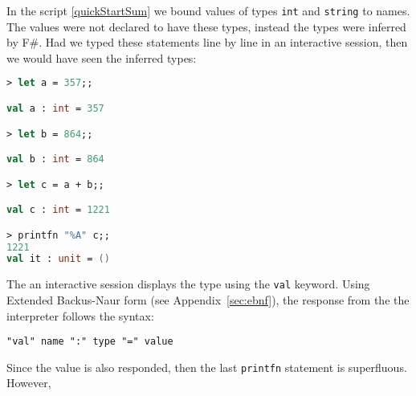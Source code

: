 In the script \ref{quickStartSum} we bound values of types \lstinline|int| and \lstinline|string| to names. The values were not declared to have these types, instead the types were inferred by F\#. Had we typed these statements line by line in an interactive session, then we would have seen the inferred types:
\begin{comment}
$ fsharpi

F# Interactive for F# 4.0 (Open Source Edition)
Freely distributed under the Apache 2.0 Open Source License

For help type #help;;

\end{comment}
\begin{comment}
  $
\end{comment}
\begin{lstlisting}[language=fsharp,caption={fsharpi}]
> let a = 357;;         

val a : int = 357

> let b = 864;;

val b : int = 864

> let c = a + b;;

val c : int = 1221

> printfn "%A" c;;
1221
val it : unit = ()
\end{lstlisting}
\begin{comment}

> #quit;;
\end{comment}
 The an interactive session displays the type using the \lstinline|val| keyword. Using Extended Backus-Naur form (see Appendix~\ref{sec:ebnf}), the response from the the interpreter follows the syntax: 
\begin{lstlisting}[language=ebnf]
  "val" name ":" type "=" value
\end{lstlisting}
Since the value is also responded, then the last \lstinline|printfn| statement is superfluous. However, 


